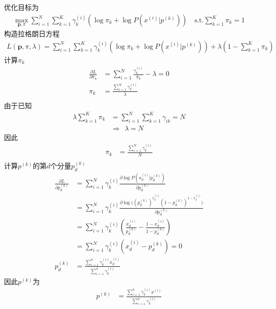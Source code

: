 \documentclass[12pt, a4paper]{article}
\begin{document}
\subsection{}

优化目标为
\begin{align*}
    \mathop{max}\limits_{\mathbf{p},\pi}\sum_{i=1}^{N}\sum_{k=1}^K \gamma_k^{(i)}(\log\pi_k+\log P(x^{(i)}\vert p^{(k)}))
    \quad \text{s.t.} \sum_{k=1}^K\pi_k=1
\end{align*}
构造拉格朗日方程
\begin{align*}
    L(\mathbf{p},\pi,\lambda)=\sum_{i=1}^{N}\sum_{k=1}^K \gamma_k^{(i)}(\log\pi_k+\log P(x^{(i)}\vert p^{(k)}))
    +\lambda(1-\sum_{k=1}^K\pi_k)
\end{align*}
计算$\pi_k$
\begin{align*}
    \frac{\partial L}{\partial \pi_k}&=\sum_{i=1}^N\frac{\gamma_k^{(i)}}{\pi_k}-\lambda=0\\
    \pi_k&=\frac{\sum_{i=1}^{N}\gamma_k^{(i)}}{\lambda}\\
\end{align*}
由于已知
\begin{align*}
    \lambda \sum_{k=1}^K\pi_k&=\sum_{i=1}^N\sum_{k=1}^K\gamma_{ik}=N\\
    &\Rightarrow \ \ \lambda=N
\end{align*}
因此
\begin{align*}
    \pi_k&=\frac{\sum_{i=1}^{N}\gamma_k^{(i)}}{N}\\
\end{align*}
计算$p^{(k)}$的第$d$个分量$p^{(k)}_d$
\begin{align*}
    \frac{\partial L}{\partial p^{(k)}_d}&=\sum_{i=1}^N \gamma_k^{(i)}\frac{\partial\log P(x^{(i)}_d\vert p^{(k)}_d)}{\partial p^{(k)}_d}\\
    &=\sum_{i=1}^N \gamma_k^{(i)}\frac{\partial\log\bigl((p^{(k)}_d)^{x^{(i)}_d}(1-p^{(k)}_d)^{1-x^{(i)}_d}\bigr)}{\partial p^{(k)}_d}\\
    &=\sum_{i=1}^N \gamma_k^{(i)}(\frac{x_d^{(i)}}{p^{(k)}_d}-\frac{1-x_d^{(i)}}{1-p_d^{(k)}})\\
    &=\sum_{i=1}^N \gamma_k^{(i)}(x_d^{(i)}-p_d^{(k)})=0\\
    p_d^{(k)}&=\frac{\sum_{i=1}^n\gamma_k^{(i)}x_d^{(i)}}{\sum_{i=1}^n\gamma_k^{(i)}}
\end{align*}
因此$p^{(k)}$为
\begin{align*}
    p^{(k)}&=\frac{\sum_{i=1}^n\gamma_k^{(i)}x^{(i)}}{\sum_{i=1}^n\gamma_k^{(i)}}
\end{align*}
\end{document}

